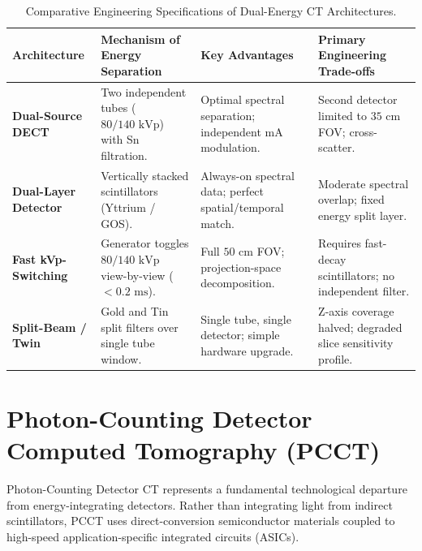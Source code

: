 \documentclass[11pt,a4paper]{article}
\begin{document}
\begin{table}[htbp]
\centering
\small
\setlength{\tabcolsep}{2.5pt}
\caption{Comparative Engineering Specifications of Dual-Energy CT Architectures.}
\label{tab:dect_architectures}
\begin{tabular}{p{2.8cm} p{3.8cm} p{3.8cm} p{4.0cm}}
\toprule
\textbf{Architecture} & \textbf{Mechanism of Energy Separation} & \textbf{Key Advantages} & \textbf{Primary Engineering Trade-offs} \\
\midrule
\textbf{Dual-Source DECT} & Two independent tubes ($80 / 140\text{ kVp}$) with Sn filtration. & Optimal spectral separation; independent mA modulation. & Second detector limited to $35\text{ cm}$ FOV; cross-scatter. \\
\addlinespace
\textbf{Dual-Layer Detector} & Vertically stacked scintillators (Yttrium / GOS). & Always-on spectral data; perfect spatial/temporal match. & Moderate spectral overlap; fixed energy split layer. \\
\addlinespace
\textbf{Fast kVp-Switching} & Generator toggles $80/140\text{ kVp}$ view-by-view ($< 0.2\text{ ms}$). & Full $50\text{ cm}$ FOV; projection-space decomposition. & Requires fast-decay scintillators; no independent filter. \\
\addlinespace
\textbf{Split-Beam / Twin} & Gold and Tin split filters over single tube window. & Single tube, single detector; simple hardware upgrade. & Z-axis coverage halved; degraded slice sensitivity profile. \\
\bottomrule
\end{tabular}
\end{table}

\section{Photon-Counting Detector Computed Tomography (PCCT)}

Photon-Counting Detector CT represents a fundamental technological departure from energy-integrating detectors. Rather than integrating light from indirect scintillators, PCCT uses direct-conversion semiconductor materials coupled to high-speed application-specific integrated circuits (ASICs).
\end{document}
